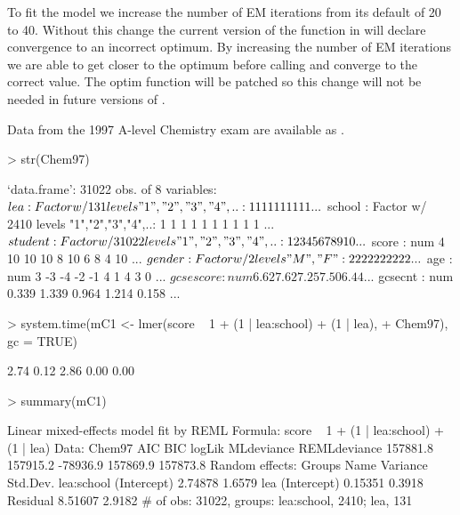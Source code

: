 \documentclass[12pt]{article}
\begin{document}
To fit the model  we increase the number of EM iterations
from its default of 20 to 40.  Without this change the current version
of the  function in \RR{} will declare convergence to an
incorrect optimum.  By increasing the number of EM iterations we are
able to get closer to the optimum before calling  and
converge to the correct value.  The optim function will be patched so
this change will not be needed in future versions of \RR{}.

Data from the 1997 A-level Chemistry exam are available as .

\begin{Schunk}
\begin{Sinput}
> str(Chem97)
\end{Sinput}
\begin{Soutput}
`data.frame':	31022 obs. of  8 variables:
 $ lea      : Factor w/ 131 levels "1","2","3","4",..: 1 1 1 1 1 1 1 1 1 1 ...
 $ school   : Factor w/ 2410 levels "1","2","3","4",..: 1 1 1 1 1 1 1 1 1 1 ...
 $ student  : Factor w/ 31022 levels "1","2","3","4",..: 1 2 3 4 5 6 7 8 9 10 ...
 $ score    : num  4 10 10 10 8 10 6 8 4 10 ...
 $ gender   : Factor w/ 2 levels "M","F": 2 2 2 2 2 2 2 2 2 2 ...
 $ age      : num  3 -3 -4 -2 -1 4 1 4 3 0 ...
 $ gcsescore: num  6.62 7.62 7.25 7.50 6.44 ...
 $ gcsecnt  : num  0.339 1.339 0.964 1.214 0.158 ...
\end{Soutput}
\begin{Sinput}
> system.time(mC1 <- lmer(score ~ 1 + (1 | lea:school) + (1 | lea), 
+     Chem97), gc = TRUE)
\end{Sinput}
\begin{Soutput}
[1] 2.74 0.12 2.86 0.00 0.00
\end{Soutput}
\begin{Sinput}
> summary(mC1)
\end{Sinput}
\begin{Soutput}
Linear mixed-effects model fit by REML
Formula: score ~ 1 + (1 | lea:school) + (1 | lea) 
   Data: Chem97 
      AIC      BIC   logLik MLdeviance REMLdeviance
 157881.8 157915.2 -78936.9   157869.9     157873.8
Random effects:
 Groups     Name        Variance Std.Dev.
 lea:school (Intercept) 2.74878  1.6579  
 lea        (Intercept) 0.15351  0.3918  
 Residual               8.51607  2.9182  
# of obs: 31022, groups: lea:school, 2410; lea, 131


\end{Soutput}
\end{Schunk}
\end{document}
